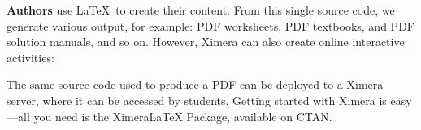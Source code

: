 \documentclass[twocolumn]{article}
\begin{document}
\begin{xframe}
    {\sffamily\bfseries Authors} use \LaTeX\ to create their content. From
    this
    single
    source code, we generate various output, for example: PDF worksheets,
    PDF
    textbooks, and	PDF solution manuals, and so on. However, Ximera can
    also create
    online interactive activities:
    \begin{center}
    \end{center}
    The same source code used to produce a PDF can be deployed to a Ximera
    server, where it can be accessed by students. Getting started with
    Ximera
    is
    easy---all you need is the XimeraLaTeX Package, available on CTAN.
\end{xframe}
\end{document}
